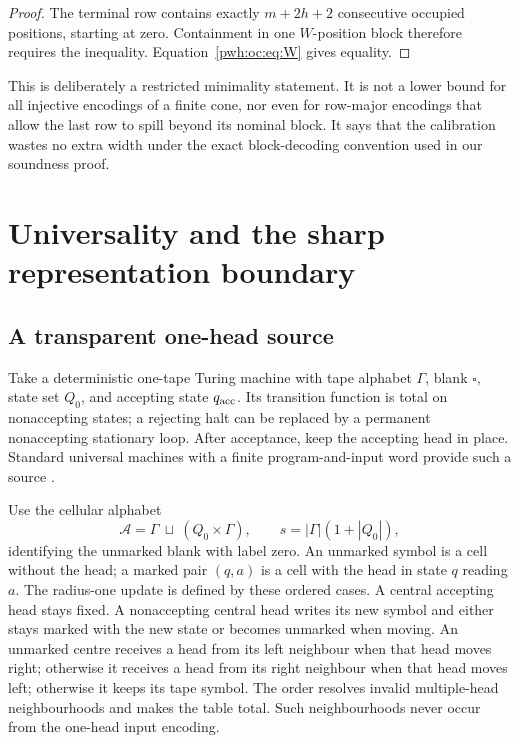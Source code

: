 \documentclass[11pt,letterpaper]{article}
\numberwithin{equation}{section}
\theoremstyle{definition}
\newcommand{\A}{\mathcal A}
\begin{document}
\begin{proof}
The terminal row contains exactly $m+2h+2$ consecutive occupied positions,
starting at zero. Containment in one $W$-position block therefore requires
the inequality. Equation~\eqref{pwh:oc:eq:W} gives equality.
\end{proof}

This is deliberately a restricted minimality statement. It is not a lower
bound for all injective encodings of a finite cone, nor even for row-major
encodings that allow the last row to spill beyond its nominal block.
It says that the calibration wastes no extra width under the exact
block-decoding convention used in our soundness proof.

\section{Universality and the sharp representation boundary}
\label{pwh:oc:sec:universality}

\subsection{A transparent one-head source}

Take a deterministic one-tape Turing machine with tape alphabet $\Gamma$,
blank $\square$, state set $Q_0$, and accepting state $q_{\rm acc}$.
Its transition function is total on nonaccepting states; a rejecting halt
can be replaced by a permanent nonaccepting stationary loop. After
acceptance, keep the accepting head in place. Standard universal machines
with a finite program-and-input word provide such a source
\cite{oc:Turing}.

Use the cellular alphabet
\begin{equation}
 \A=\Gamma\ \sqcup\ (Q_0\times\Gamma),\qquad
 s=|\Gamma|(1+|Q_0|),
 \label{pwh:oc:eq:tmca}
\end{equation}
identifying the unmarked blank with label zero. An unmarked symbol is a
cell without the head; a marked pair $(q,a)$ is a cell with the head in
state $q$ reading $a$. The radius-one update is defined by these ordered
cases. A central accepting head stays fixed. A nonaccepting central head
writes its new symbol and either stays marked with the new state or
becomes unmarked when moving. An unmarked centre receives a head from
its left neighbour when that head moves right; otherwise it receives a
head from its right neighbour when that head moves left; otherwise it
keeps its tape symbol. The order resolves invalid multiple-head
neighbourhoods and makes the table total. Such neighbourhoods never
occur from the one-head input encoding.
\end{document}
